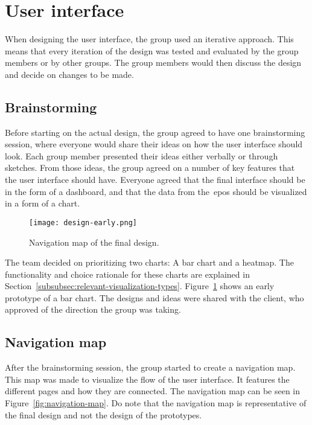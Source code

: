 \section{User interface}\label{sec:user-interface}

When designing the user interface, the group used an iterative approach.
This means that every iteration of the design was tested and evaluated by the group members or by other groups.
The group members would then discuss the design and decide on changes to be made.

\subsection{Brainstorming}\label{subsec:brainstorming}

Before starting on the actual design, the group agreed to have one brainstorming session, where everyone would share
their ideas on how the user interface should look.
Each group member presented their ideas either verbally or through sketches.
From those ideas, the group agreed on a number of key features that the user interface should have.
Everyone agreed that the final interface should be in the form of a dashboard, and that the data from
the~\acrshort{epos} should be visualized in a form of a chart.

\begin{figure}[H]
    \centering
    \texttt{[image: design-early.png]}
    \caption{Navigation map of the final design.
    }\label{fig:design-early}
\end{figure}

The team decided on prioritizing two charts: A bar chart and a heatmap.
The functionality and choice rationale for these charts are explained in
Section~\ref{subsubsec:relevant-visualization-types}.
Figure~\ref{fig:design-early} shows an early prototype of a bar chart.
The designs and ideas were shared with the client, who approved of the direction the group was taking.

\subsection{Navigation map}\label{subsec:navigation-map}

After the brainstorming session, the group started to create a navigation map.
This map was made to visualize the flow of the user interface.
It features the different pages and how they are connected.
The navigation map can be seen in Figure~\ref{fig:navigation-map}.
Do note that the navigation map is representative of the final design and not the design of the prototypes.

